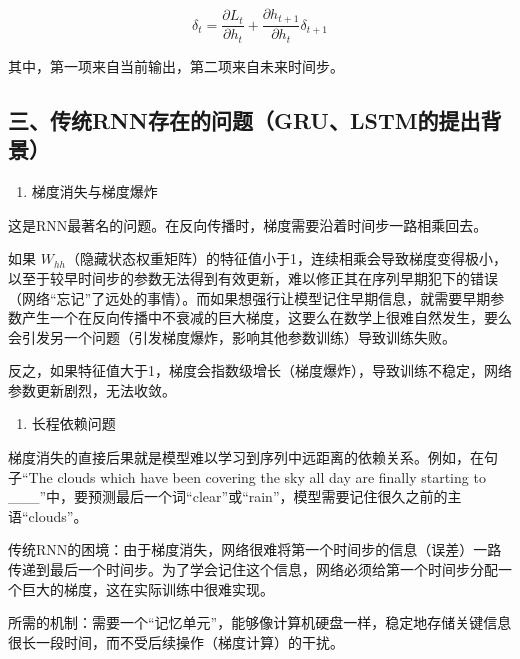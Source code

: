 \[
\delta_t = \frac{\partial L_t}{\partial h_t} + \frac{\partial h_{t+1}}{\partial h_t}\delta_{t+1}
\]

其中，第一项来自当前输出，第二项来自未来时间步。

\hypertarget{ux4e09ux4f20ux7edfrnnux5b58ux5728ux7684ux95eeux9898grulstmux7684ux63d0ux51faux80ccux666f}{%
\subsection{三、传统RNN存在的问题（GRU、LSTM的提出背景）}\label{ux4e09ux4f20ux7edfrnnux5b58ux5728ux7684ux95eeux9898grulstmux7684ux63d0ux51faux80ccux666f}}

\begin{enumerate}
\def\labelenumi{\arabic{enumi}.}
\tightlist
\item
  梯度消失与梯度爆炸
\end{enumerate}

这是RNN最著名的问题。在反向传播时，梯度需要沿着时间步一路相乘回去。

如果 \(W_{hh}\)（隐藏状态权重矩阵）的特征值小于1，连续相乘会导致梯度变得极小，以至于较早时间步的参数无法得到有效更新，难以修正其在序列早期犯下的错误（网络``忘记''了远处的事情）。而如果想强行让模型记住早期信息，就需要早期参数产生一个在反向传播中不衰减的巨大梯度，这要么在数学上很难自然发生，要么会引发另一个问题（引发梯度爆炸，影响其他参数训练）导致训练失败。

反之，如果特征值大于1，梯度会指数级增长（梯度爆炸），导致训练不稳定，网络参数更新剧烈，无法收敛。

\begin{enumerate}
\def\labelenumi{\arabic{enumi}.}
\setcounter{enumi}{1}
\tightlist
\item
  长程依赖问题
\end{enumerate}

梯度消失的直接后果就是模型难以学习到序列中远距离的依赖关系。例如，在句子``The clouds which have been covering the sky all day are finally starting to \_\_\_''中，要预测最后一个词``clear''或``rain''，模型需要记住很久之前的主语``clouds''。

传统RNN的困境：由于梯度消失，网络很难将第一个时间步的信息（误差）一路传递到最后一个时间步。为了学会记住这个信息，网络必须给第一个时间步分配一个巨大的梯度，这在实际训练中很难实现。

所需的机制：需要一个``记忆单元''，能够像计算机硬盘一样，稳定地存储关键信息很长一段时间，而不受后续操作（梯度计算）的干扰。

